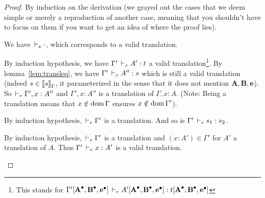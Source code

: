 \documentclass[a4paper,english]{lipics-utf8x}
\begin{document}
  \begin{proof}
    By induction on the derivation (we grayed out the cases that we deem
    simple or merely a reproduction of another case, meaning that you shouldn't
    have to focus on them if you want to get an idea of where the proof lies).

    \leavevmode
    \begin{caselist}
      \begin{graycase}
        \begin{mathc}
          \ru{}{\derr \cdot}
        \end{mathc}
        We have $\,\vdash_e \cdot$, which corresponds to a valid translation.
      \end{graycase}

      \begin{graycase}
        \begin{mathc}
        \end{mathc}
        By induction hypothesis, we have $\Gamma' \,\vdash_e A' : t$ a valid
        translation\footnote{This stands for
        $\Gamma'[\operatorname{\operatorname{\mathbf{A}}^\bullet},\operatorname{\operatorname{\mathbf{B}}^\bullet},\operatorname{\operatorname{\mathbf{e}}^\bullet}] \,\vdash_e A'[\operatorname{\operatorname{\mathbf{A}}^\bullet},\operatorname{\operatorname{\mathbf{B}}^\bullet},\operatorname{\operatorname{\mathbf{e}}^\bullet}] : t[\operatorname{\operatorname{\mathbf{A}}^\bullet},\operatorname{\operatorname{\mathbf{B}}^\bullet},\operatorname{\operatorname{\mathbf{e}}^\bullet}]$}.
        By lemma~\ref{lem:transleq}, we have
        $\Gamma' \,\vdash_e A'' : s$ which is still a valid translation
        (indeed $s \in \mathopen{{[\kern-0.14em[}} s \mathclose{{]\kern-0.14em]}}_{\Gamma}$, it parameterized in the sense that it
        does not mention $\operatorname{\mathbf{A}},\operatorname{\mathbf{B}},\operatorname{\mathbf{e}}$).
        So $\,\vdash_e \Gamma', x : A''$ and $\Gamma', x : A''$ is a translation of
        $\Gamma, x : A$.
        (Note: Being a translation means that $x \notin \operatorname{dom} \Gamma$ ensures
        $x \notin \operatorname{dom} \Gamma'$).
      \end{graycase}

      \begin{graycase}
        \begin{mathc}
        \end{mathc}
        By induction hypothesis, $\,\vdash_e \Gamma'$ is a translation.
        And so is $\Gamma' \,\vdash_e s_1 : s_2$.
      \end{graycase}

      \begin{graycase}
        \begin{mathc}
        \end{mathc}
        By induction hypothesis, $\,\vdash_e \Gamma'$ is a translation and
        $(x : A') \in \Gamma'$ for $A'$ a translation of $A$.
        Thus $\Gamma' \,\vdash_e x : A'$ is a valid translation.
      \end{graycase}


\end{caselist}
\end{proof}
\end{document}
